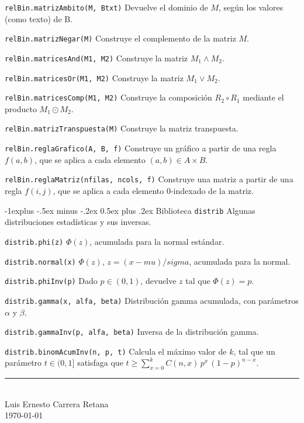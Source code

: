\documentclass[10pt,landscape]{article}
\makeatletter
\renewcommand{\subsection}{\@startsection{subsection}{2}{0mm}%
                                {-1explus -.5ex minus -.2ex}%
                                {0.5ex plus .2ex}%
                                {\normalfont\normalsize\bfseries}}
\makeatother
\begin{document}
\begin{multicols}{3}
\begin{asparaitem}
\item \verb|relBin.matrizAmbito(M, Btxt)| 
  Devuelve el dominio de $M$, seg\'un los valores (como texto) de B.

\item \verb|relBin.matrizNegar(M)|
  Construye el complemento de la matriz $M$.

\item \verb|relBin.matricesAnd(M1, M2)|
  Construye la matriz $M_1 \land M_2$.

\item \verb|relBin.matricesOr(M1, M2)|
  Construye la matriz $M_1 \lor M_2$.

\item \verb|relBin.matricesComp(M1, M2)|
  Construye la composici\'on $R_2 \circ R_1$ mediante el producto $M_1 \odot M_2$.

\item \verb|relBin.matrizTranspuesta(M)|
  Construye la matriz transpuesta.
  
\item \verb|relBin.reglaGrafico(A, B, f)|
  Construye un gr\'afico a partir de una regla $f(a,b)$, que se aplica a cada elemento $(a,b)\in A\times B$.
  
\item \verb|relBin.reglaMatriz(nfilas, ncols, f)|
  Construye una matriz a partir de una regla $f(i,j)$, que se aplica a cada elemento 0-indexado de la matriz.
\end{asparaitem}


\subsection{Biblioteca \texttt{distrib}}
Algunas distribuciones estad\'isticas y sus inversas.

\begin{asparaitem}
\item \verb|distrib.phi(z)| $\Phi(z)$, acumulada para la normal est\'andar.
\item \verb|distrib.normal(x)| $\Phi(z)$, $z=(x-mu)/sigma$, acumulada para la normal.
\item \verb|distrib.phiInv(p)| Dado $p\in (0,1)$, devuelve $z$ tal que $\Phi(z)=p$.
\item \verb|distrib.gamma(x, alfa, beta)| Distribuci\'on gamma acumulada, con par\'ametros $\alpha$ y $\beta$.
\item \verb|distrib.gammaInv(p, alfa, beta)| Inversa de la distribuci\'on gamma.
\item \verb|distrib.binomAcumInv(n, p, t)| Calcula el m\'aximo valor de $k$, tal que un par\'ametro
$t \in (0, 1]$ satisfaga que $t \geq \sum_{x=0}^k C(n, x)\, p^x\,  (1-p)^{n-x}$.

\end{asparaitem}

\rule{0.3\linewidth}{0.25pt}
\scriptsize \\
Luis Ernesto Carrera Retana \\
\today
\end{multicols}
\end{document}
